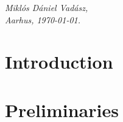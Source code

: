 \documentclass[twoside,11pt,openright]{report}
\theoremstyle{definition}
\begin{document}







\printunsrtglossary[type=symbols,style=long, title=Notations]

\printacronyms

\vspace{2ex}

\begin{flushright}
  \emph{Mikl\'os D\'aniel Vad\'asz,}\\ 
  \emph{Aarhus, \today.}
\end{flushright}

\tableofcontents
\cleardoublepage
{}
\setcounter{secnumdepth}{2}


%

\chapter{Introduction}

\label{ch:introtodo}

\chapter{Preliminaries}	%
\label{ch:prelim}



%
\end{document}
